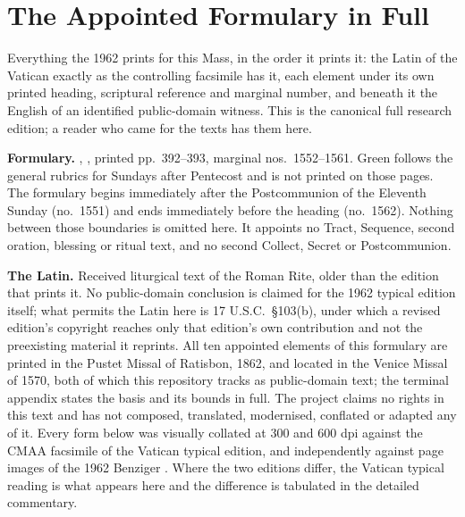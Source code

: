 \sectionguard
\section*{The Appointed Formulary in Full}

Everything the 1962  prints for this Mass, in the order
it prints it: the Latin of the Vatican  exactly as the
controlling facsimile has it, each element under its own printed heading,
scriptural reference and marginal number, and beneath it the English of an
identified public-domain witness. This is the canonical full research edition;
a reader who came for the texts has them here.

\textbf{Formulary.} , , printed pp.~392--393, marginal nos.\ 1552--1561. Green follows the
general rubrics for Sundays after Pentecost and is not printed on those pages.
The formulary begins immediately after the Postcommunion of the Eleventh
Sunday (no.\ 1551) and ends immediately before the heading  (no.\ 1562). Nothing between those boundaries
is omitted here. It appoints no Tract, Sequence, second oration, blessing or
ritual text, and no second Collect, Secret or Postcommunion.

\textbf{The Latin.} Received liturgical text of the Roman Rite, older than the
edition that prints it. No public-domain conclusion is claimed for the 1962
typical edition itself; what permits the Latin here is 17 U.S.C.\ \S103(b),
under which a revised edition's copyright reaches only that edition's own
contribution and not the preexisting material it reprints. All ten appointed
elements of this formulary are printed in the Pustet Missal of Ratisbon, 1862,
and located in the Venice Missal of 1570, both of which this repository tracks
as public-domain text; the terminal appendix states the basis and its bounds
in full. The project claims no rights in this text and has not composed,
translated, modernised, conflated or adapted any of it. Every form below was
visually collated at 300 and 600 dpi against the CMAA facsimile of the Vatican
typical edition, and independently against page images of the 1962 Benziger
. Where the two editions differ, the Vatican
typical reading is what appears here and the difference is tabulated in the
detailed commentary.

